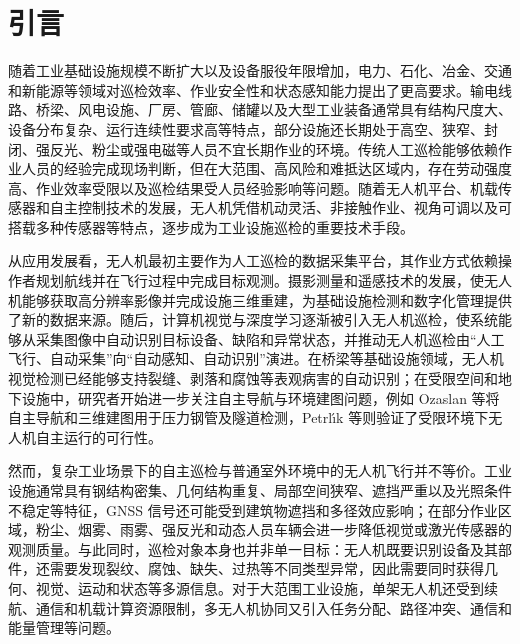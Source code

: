 \section{引言}

随着工业基础设施规模不断扩大以及设备服役年限增加，电力、石化、冶金、交通和新能源等领域对巡检效率、作业安全性和状态感知能力提出了更高要求。输电线路、桥梁、风电设施、厂房、管廊、储罐以及大型工业装备通常具有结构尺度大、设备分布复杂、运行连续性要求高等特点，部分设施还长期处于高空、狭窄、封闭、强反光、粉尘或强电磁等人员不宜长期作业的环境。传统人工巡检能够依赖作业人员的经验完成现场判断，但在大范围、高风险和难抵达区域内，存在劳动强度高、作业效率受限以及巡检结果受人员经验影响等问题。随着无人机平台、机载传感器和自主控制技术的发展，无人机凭借机动灵活、非接触作业、视角可调以及可搭载多种传感器等特点，逐步成为工业设施巡检的重要技术手段\cite{floreano2015science,kumar2012opportunities,shakhatreh2019survey,kanellakis2017survey}。

从应用发展看，无人机最初主要作为人工巡检的数据采集平台，其作业方式依赖操作者规划航线并在飞行过程中完成目标观测。摄影测量和遥感技术的发展，使无人机能够获取高分辨率影像并完成设施三维重建，为基础设施检测和数字化管理提供了新的数据来源\cite{colomina2014unmanned,nex2014uav}。随后，计算机视觉与深度学习逐渐被引入无人机巡检，使系统能够从采集图像中自动识别目标设备、缺陷和异常状态，并推动无人机巡检由“人工飞行、自动采集”向“自动感知、自动识别”演进\cite{nguyen2018automatic,miao2020uav,zhouwq2024review}。在桥梁等基础设施领域，无人机视觉检测已经能够支持裂缝、剥落和腐蚀等表观病害的自动识别\cite{morgenthal2014quality,ham2016visual,dorafshan2018bridge,spencer2019advances}；在受限空间和地下设施中，研究者开始进一步关注自主导航与环境建图问题，例如 Ozaslan 等将自主导航和三维建图用于压力钢管及隧道检测，Petrl{\'\i}k 等则验证了受限环境下无人机自主运行的可行性\cite{ozaslan2017autonomous,petrlik2020robust}。

然而，复杂工业场景下的自主巡检与普通室外环境中的无人机飞行并不等价。工业设施通常具有钢结构密集、几何结构重复、局部空间狭窄、遮挡严重以及光照条件不稳定等特征，GNSS 信号还可能受到建筑物遮挡和多径效应影响；在部分作业区域，粉尘、烟雾、雨雾、强反光和动态人员车辆会进一步降低视觉或激光传感器的观测质量\cite{scaramuzza2014vision,lvyang2019sense,petrlik2020robust}。与此同时，巡检对象本身也并非单一目标：无人机既要识别设备及其部件，还需要发现裂纹、腐蚀、缺失、过热等不同类型异常，因此需要同时获得几何、视觉、运动和状态等多源信息。对于大范围工业设施，单架无人机还受到续航、通信和机载计算资源限制，多无人机协同又引入任务分配、路径冲突、通信和能量管理等问题\cite{zeng2016wireless,mozaffari2019tutorial,zhang2019energy}。


